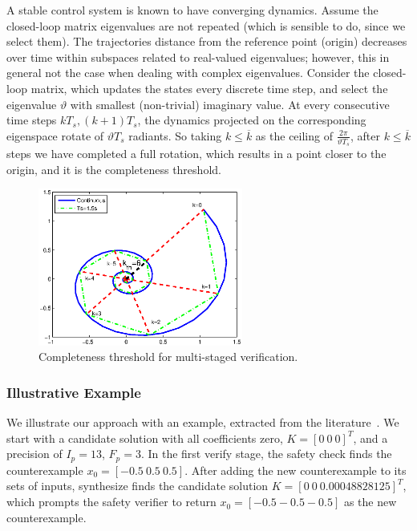 \documentclass[runningheads,a4paper]{llncs}
\begin{document}
\begin{enumerate}
A stable control system is known to have converging dynamics. 
Assume the closed-loop matrix eigenvalues are not repeated 
(which is sensible to do, since we select them). 
The trajectories distance from the reference point (origin) 
decreases over time within subspaces related to real-valued eigenvalues;  
however, this in general not the case when dealing with complex eigenvalues.  
Consider the closed-loop matrix, which updates the states every discrete time step, 
and select the eigenvalue $\vartheta$ with smallest (non-trivial) imaginary value. 
At every consecutive time steps $kT_s, (k+1)T_s$, 
the dynamics projected on the corresponding eigenspace rotate of $\vartheta T_s$ radiants.  
So taking $k{\leq}\overline{k}$ as the ceiling of $\frac{2\pi}{\vartheta T_s}$, 
after $k{\leq}\overline{k}$ steps we have completed a full rotation, which results in a point closer to the origin, and it is the completeness threshold. 


\begin{figure}[t]
\centering
\includegraphics[width=0.6\textwidth]{ct.eps}
\vspace{0.1cm}
\caption{Completeness threshold for multi-staged verification.}
\label{fig:ct}
\end{figure}

\end{enumerate}

\subsubsection{Illustrative Example} \label{sec:running-ex}

We illustrate our approach with an example,
extracted from the literature~\cite{Franklin15}.
%
We start with a candidate solution with all coefficients zero, $K=[0
  \ 0 \ 0]^T$, and a precision of $I_p=13$, $F_p=3$.  In the first
{\sc verify} stage, the {\sc safety} check finds the counterexample
%
$ x_0 = [-0.5 \ 0.5 \ 0.5] $.
%
After adding the new counterexample to its sets of {\sc inputs}, {\sc
  synthesize} finds the candidate solution $K=[0 \ 0
  \ 0.00048828125]^T$, which prompts the {\sc safety} verifier to
return $x_0=[-0.5 -0.5 -0.5]$ as the new counterexample.
\end{document}
